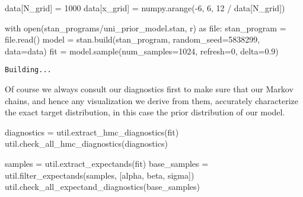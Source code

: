 \documentclass[
  letterpaper,
  DIV=11,
  numbers=noendperiod]{scrartcl}
\newenvironment{Shaded}{\begin{snugshade}}{\end{snugshade}}
\newcommand{\BuiltInTok}[1]{\textcolor[rgb]{0.00,0.23,0.31}{#1}}
\newcommand{\ControlFlowTok}[1]{\textcolor[rgb]{0.00,0.23,0.31}{#1}}
\newcommand{\DecValTok}[1]{\textcolor[rgb]{0.68,0.00,0.00}{#1}}
\newcommand{\FloatTok}[1]{\textcolor[rgb]{0.68,0.00,0.00}{#1}}
\newcommand{\ImportTok}[1]{\textcolor[rgb]{0.00,0.46,0.62}{#1}}
\newcommand{\NormalTok}[1]{\textcolor[rgb]{0.00,0.23,0.31}{#1}}
\newcommand{\OperatorTok}[1]{\textcolor[rgb]{0.37,0.37,0.37}{#1}}
\newcommand{\StringTok}[1]{\textcolor[rgb]{0.13,0.47,0.30}{#1}}
\begin{document}
\begin{Shaded}
\begin{Highlighting}[]
\NormalTok{data[}\StringTok{\textquotesingle{}N\_grid\textquotesingle{}}\NormalTok{] }\OperatorTok{=} \DecValTok{1000}
\NormalTok{data[}\StringTok{\textquotesingle{}x\_grid\textquotesingle{}}\NormalTok{] }\OperatorTok{=}\NormalTok{ numpy.arange(}\OperatorTok{{-}}\DecValTok{6}\NormalTok{, }\DecValTok{6}\NormalTok{, }\DecValTok{12} \OperatorTok{/}\NormalTok{ data[}\StringTok{\textquotesingle{}N\_grid\textquotesingle{}}\NormalTok{])}

\ControlFlowTok{with} \BuiltInTok{open}\NormalTok{(}\StringTok{\textquotesingle{}stan\_programs/uni\_prior\_model.stan\textquotesingle{}}\NormalTok{, }\StringTok{\textquotesingle{}r\textquotesingle{}}\NormalTok{) }\ImportTok{as} \BuiltInTok{file}\NormalTok{:}
\NormalTok{  stan\_program }\OperatorTok{=} \BuiltInTok{file}\NormalTok{.read()}
\NormalTok{model }\OperatorTok{=}\NormalTok{ stan.build(stan\_program, random\_seed}\OperatorTok{=}\DecValTok{5838299}\NormalTok{, data}\OperatorTok{=}\NormalTok{data)}
\NormalTok{fit }\OperatorTok{=}\NormalTok{ model.sample(num\_samples}\OperatorTok{=}\DecValTok{1024}\NormalTok{, refresh}\OperatorTok{=}\DecValTok{0}\NormalTok{, delta}\OperatorTok{=}\FloatTok{0.9}\NormalTok{)}
\end{Highlighting}
\end{Shaded}

\begin{verbatim}
Building...
\end{verbatim}

Of course we always consult our diagnostics first to make sure that our
Markov chains, and hence any visualization we derive from them,
accurately characterize the exact target distribution, in this case the
prior distribution of our model.

\begin{Shaded}
\begin{Highlighting}[]
\NormalTok{diagnostics }\OperatorTok{=}\NormalTok{ util.extract\_hmc\_diagnostics(fit)}
\NormalTok{util.check\_all\_hmc\_diagnostics(diagnostics)}

\NormalTok{samples }\OperatorTok{=}\NormalTok{ util.extract\_expectands(fit)}
\NormalTok{base\_samples }\OperatorTok{=}\NormalTok{ util.filter\_expectands(samples,}
\NormalTok{                                      [}\StringTok{\textquotesingle{}alpha\textquotesingle{}}\NormalTok{, }\StringTok{\textquotesingle{}beta\textquotesingle{}}\NormalTok{, }\StringTok{\textquotesingle{}sigma\textquotesingle{}}\NormalTok{])}
\NormalTok{util.check\_all\_expectand\_diagnostics(base\_samples)}
\end{Highlighting}
\end{Shaded}
\end{document}
